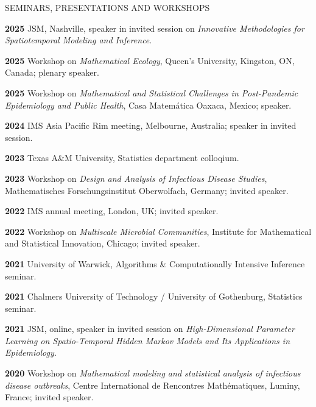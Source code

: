 \begin{mylist}{SEMINARS, PRESENTATIONS AND WORKSHOPS}
  \setlength{\itemsep}{0.15 cm}

 \item{\bf 2025 }  JSM, Nashville, speaker in invited session on {\it  Innovative Methodologies for Spatiotemporal Modeling and Inference}.

\item{\bf 2025 } Workshop on {\it Mathematical Ecology}, Queen's University, Kingston, ON, Canada; plenary speaker.
  
\item{\bf 2025 } Workshop on {\it Mathematical and Statistical Challenges in Post-Pandemic Epidemiology and Public Health}, Casa Matem\'{a}tica Oaxaca, Mexico; speaker.
  
\item{\bf 2024 }  IMS Asia Pacific Rim meeting, Melbourne, Australia; speaker in invited session.

\item{\bf 2023 } Texas A\&M University, Statistics department colloqium. 
  
\item{\bf 2023 }  Workshop on {\it Design and Analysis of Infectious Disease Studies}, Mathematisches Forschungsinstitut Oberwolfach, Germany; invited speaker.
  
\item{\bf 2022} IMS annual meeting, London, UK; invited speaker.
  
\item{\bf 2022} Workshop on {\it Multiscale Microbial Communities}, Institute for Mathematical and Statistical Innovation, Chicago; invited speaker.
  
\item{\bf 2021} University of Warwick, Algorithms \& Computationally Intensive Inference seminar.
               
\item{\bf 2021} Chalmers University of Technology / University of Gothenburg, Statistics seminar.
                 
\item{\bf 2021} JSM, online, speaker in invited session on {\it High-Dimensional Parameter Learning on Spatio-Temporal Hidden Markov Models and Its Applications in Epidemiology.}
                 
\item{\bf 2020 } Workshop on {\it Mathematical modeling and statistical analysis of infectious disease outbreaks}, Centre International de Rencontres Math\'{e}matiques, Luminy, France; invited speaker.


\end{mylist}
